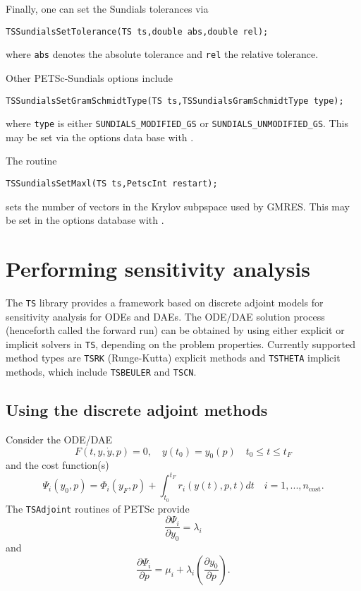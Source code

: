 {Finally, one can set the Sundials tolerances via
\begin{lstlisting}
TSSundialsSetTolerance(TS ts,double abs,double rel);
\end{lstlisting}
where \lstinline{abs} denotes the absolute tolerance and \lstinline{rel}
the relative tolerance.

Other PETSc-Sundials options include
\begin{lstlisting}
TSSundialsSetGramSchmidtType(TS ts,TSSundialsGramSchmidtType type);
\end{lstlisting}
where \lstinline{type} is either \lstinline{SUNDIALS_MODIFIED_GS} or
\lstinline{SUNDIALS_UNMODIFIED_GS}.
 This may be set via the options data base
with .

The routine
\begin{lstlisting}
TSSundialsSetMaxl(TS ts,PetscInt restart);
\end{lstlisting}
sets the number of vectors in the Krylov subpspace used by GMRES.
This may be set in the options
database with  . 

\cleardoublepage
\chapter{Performing sensitivity analysis}
\label{chapter_sa}
The \lstinline{TS} library provides a framework based on discrete adjoint models
for sensitivity analysis for ODEs and DAEs.  The ODE/DAE solution
process (henceforth called the forward run) can be obtained by using
either explicit or implicit solvers in \lstinline{TS}, depending on the problem
properties. Currently supported method types are \lstinline{TSRK} (Runge-Kutta) explicit
methods and \lstinline{TSTHETA} implicit methods, which include \lstinline{TSBEULER} and \lstinline{TSCN}.

\section{Using the discrete adjoint methods}

Consider the ODE/DAE
\[
    F(t,y,\dot{y},p) = 0, \quad y(t_0)=y_0(p) \quad t_0 \le t \le t_F
\]
and the cost function(s)
\[
  \Psi_i(y_0,p) = \Phi_i(y_F,p) + \int_{t_0}^{t_F} r_i(y(t),p,t)dt \quad i=1,...,n_\text{cost}.
\]
The \lstinline{TSAdjoint} routines of PETSc provide
\[
 \frac{\partial \Psi_i}{\partial y_0} = \lambda_i
\]
and
\[
 \frac{\partial \Psi_i}{\partial p} = \mu_i + \lambda_i (\frac{\partial y_0}{\partial p}).
\]

}
